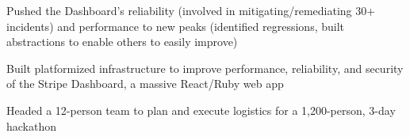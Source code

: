 \hfill {}
\begin{tightemize}
  \item Pushed the Dashboard's reliability (involved in mitigating/remediating 30+ incidents) and performance to new peaks (identified regressions, built abstractions to enable others to easily improve)
	\item Built platformized infrastructure to improve performance, reliability, and security of the Stripe Dashboard, a massive React/Ruby web app
\end{tightemize}
\sectionsep




\hfill {}
\begin{tightemize}
    \item Headed a 12-person team to plan and execute logistics for a 1,200-person, 3-day hackathon
\end{tightemize}
\sectionsep

